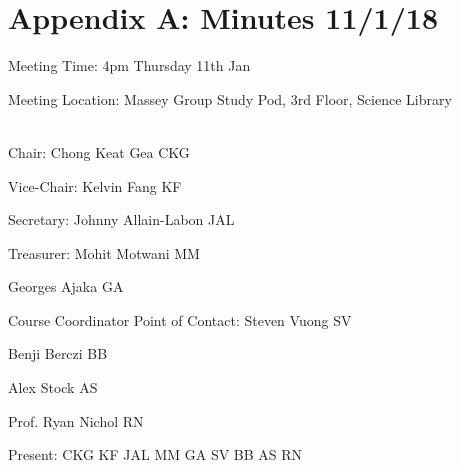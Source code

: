 \noindent 
\section{Appendix A: Minutes 11/1/18}

\noindent Meeting Time: 4pm Thursday 11th Jan

\noindent Meeting Location: Massey Group Study Pod, 3rd Floor, Science Library
\\\\
\noindent \textbf{}

\noindent Chair: Chong Keat Gea CKG

\noindent Vice-Chair: Kelvin Fang KF

\noindent Secretary: Johnny Allain-Labon JAL

\noindent Treasurer: Mohit Motwani MM

\noindent Georges Ajaka GA

\noindent Course Coordinator Point of Contact: Steven Vuong SV

\noindent Benji Berczi BB

\noindent Alex Stock AS

\noindent Prof. Ryan Nichol RN

\noindent 

\noindent Present: CKG KF JAL MM GA SV BB AS RN

